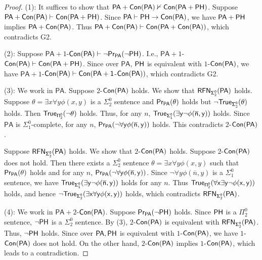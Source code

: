 \documentclass[a4paper,12pt]{amsart}
\theoremstyle{definition}
\numberwithin{equation}{section}
\begin{document}
\begin{proof}\label{}
(1): It suffices to show that $\mathsf{PA}+\sf Con(\mathsf{PA})\nvdash \sf Con(\mathsf{PA}+\sf PH)$. 
Suppose $\mathsf{PA}+\sf Con(\mathsf{PA})\vdash \sf Con(\mathsf{PA}+ \sf PH)$.  Since $\mathsf{PA}\vdash \sf PH\rightarrow \sf Con(\mathsf{PA})$, we have $\mathsf{PA}+\sf PH$ implies $\mathsf{PA}+\sf Con(\mathsf{PA})$. Thus $\mathsf{PA}+ \sf Con(\mathsf{PA})\vdash \sf Con(\mathsf{PA}+\sf Con(\mathsf{PA}))$, which contradicts {\sf G2}.

(2): Suppose $\mathsf{PA}+1$-$\sf Con(\mathsf{PA})\vdash \neg \sf Pr_{\mathsf{PA}}(\neg \sf PH)$. I.e., $\mathsf{PA}+1$-$\sf Con(\mathsf{PA})\vdash \sf Con(\mathsf{PA}+\sf PH)$. Since over $\mathsf{PA}$, $\sf PH$ is equivalent with $1$-$\sf Con(\mathsf{PA})$, we have $\mathsf{PA}+1$-$\sf Con(\mathsf{PA})\vdash Con(\mathsf{PA}+1$-$\sf Con(\mathsf{PA}))$, which contradicts {\sf G2}.

(3): We work in $\mathsf{PA}$. Suppose $2$-$\sf Con(\mathsf{PA})$ holds. We show that $\sf RFN_{\Sigma^0_2}(\mathsf{PA})$ holds. Suppose $\theta=\exists x\forall y\phi(x,y)$ is a $\Sigma^0_2$ sentence and $\sf Pr_{\mathsf{PA}}(\theta)$ holds but $\neg \sf True_{\Sigma^0_2}(\theta)$ holds.  Then $\sf True_{\Pi^0_2}(\neg\theta)$ holds. Thus, for any $n$, $\sf True_{\Sigma^0_1}(\exists y\neg \phi(\overline{n},y))$ holds. Since $\mathsf{PA}$ is $\Sigma^0_1$-complete, for any $n$, $\sf Pr_{\mathsf{PA}}(\neg\forall y \phi(\overline{n},y))$ holds. This contradicts $2$-$\sf Con(\mathsf{PA})$.

Suppose $\sf RFN_{\Sigma^0_2}(\mathsf{PA})$ holds. We show that $2$-$\sf Con(\mathsf{PA})$ holds. Suppose $2$-$\sf Con(\mathsf{PA})$ does not hold. Then there exists a $\Sigma^0_2$ sentence $\theta=\exists x\forall y\phi(x,y)$ such that $\sf Pr_{\mathsf{PA}}(\theta)$ holds and for any $n$, $\sf Pr_{\mathsf{PA}}(\neg\forall y \phi(\overline{n},y))$. Since $\neg\forall y \phi(\overline{n},y)$ is a $\Sigma^0_1$ sentence, we have $\sf True_{\Sigma^0_1}(\exists y\neg \phi(\overline{n},y))$ holds for any $n$. Thus $\sf True_{\Pi^0_2}(\forall x\exists y\neg \phi(x,y))$ holds, and hence $\neg \sf True_{\Sigma^0_2}(\exists x\forall y \phi(x,y))$ holds, which contradicts $\sf RFN_{\Sigma^0_2}(\mathsf{PA})$.



(4): We work in $\mathsf{PA}+2$-$\sf Con(\mathsf{PA})$.  Suppose $\sf Pr_{\mathsf{PA}}(\neg\sf PH)$ holds. Since $\sf PH$ is a $\Pi^0_2$ sentence, $\neg \sf PH$ is a $\Sigma^0_2$ sentence. By (3), $2$-$\sf Con(\mathsf{PA})$ is equivalent with $\sf RFN_{\Sigma^0_2}(\mathsf{PA})$. Thus, $\sf \neg PH$ holds. Since over $\mathsf{PA}, \sf PH$ is equivalent with $1$-$\sf Con(\mathsf{PA})$, we have $1$-$\sf Con(\mathsf{PA})$ does not hold. On the other hand, $2$-$\sf Con(\mathsf{PA})$ implies $1$-$\sf Con(\mathsf{PA})$, which leads to a contradiction.
\end{proof}
\end{document}
